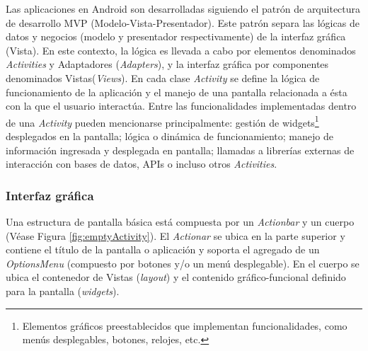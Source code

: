     \par Las aplicaciones en Android son desarrolladas siguiendo el patrón de arquitectura de desarrollo MVP (Modelo-Vista-Presentador). Este patrón separa las lógicas de datos y negocios (modelo y presentador respectivamente) de la interfaz gráfica (Vista). En este contexto, la lógica es llevada a cabo por elementos denominados \textit{Activities} y Adaptadores (\textit{Adapters}), y la interfaz gráfica por componentes denominados Vistas(\textit{Views}). En cada clase \textit{\gls{Activity}} se define la lógica de funcionamiento de la aplicación y el manejo de una pantalla relacionada a ésta con la que el usuario interactúa. Entre las funcionalidades implementadas dentro de una \textit{Activity} pueden mencionarse principalmente: gestión de widgets\footnote{Elementos gráficos preestablecidos que implementan funcionalidades, como menús desplegables, botones, relojes, etc.} desplegados en la pantalla; lógica o dinámica de funcionamiento; manejo de información ingresada y desplegada en pantalla; llamadas a librerías externas de interacción con bases de datos, APIs o incluso otros \textit{Activities}.
    
    \subsubsection{Interfaz gráfica}
    \label{explicacionInterfazGrafica}
    
    \par Una estructura de pantalla básica está compuesta por un \textit{Actionbar} y un cuerpo (Véase Figura \ref{fig:emptyActivity}). El \textit{Actionar} se ubica en la parte superior y contiene el título de la pantalla o aplicación y soporta el agregado de un \textit{OptionsMenu} (compuesto por botones y/o un menú desplegable). En el cuerpo se ubica el contenedor de Vistas (\textit{layout}) y el contenido gráfico-funcional definido para la pantalla (\textit{widgets}).
    
